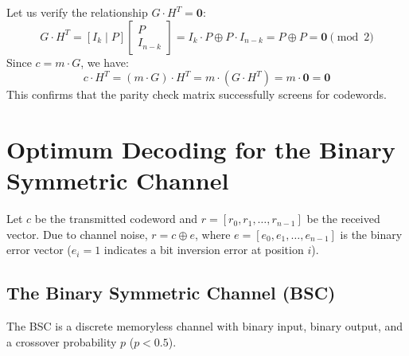 \documentclass[12pt,a4paper]{article}
\begin{document}
\begin{tcolorbox}[examplebox, title={\textbf{Verification of Orthogonality}}]
Let us verify the relationship $G \cdot H^T = \mathbf{0}$:
\[ G \cdot H^T = [I_k \mid P] \begin{bmatrix} P \\ I_{n-k} \end{bmatrix} = I_k \cdot P \oplus P \cdot I_{n-k} = P \oplus P = \mathbf{0} \pmod 2 \]
Since $c = m \cdot G$, we have:
\[ c \cdot H^T = (m \cdot G) \cdot H^T = m \cdot (G \cdot H^T) = m \cdot \mathbf{0} = \mathbf{0} \]
This confirms that the parity check matrix successfully screens for codewords.
\end{tcolorbox}

\section{Optimum Decoding for the Binary Symmetric Channel}

Let $c$ be the transmitted codeword and $r = [r_0, r_1, \dots, r_{n-1}]$ be the received vector. Due to channel noise, $r = c \oplus e$, where $e = [e_0, e_1, \dots, e_{n-1}]$ is the binary error vector ($e_i = 1$ indicates a bit inversion error at position $i$).

\subsection{The Binary Symmetric Channel (BSC)}
The BSC is a discrete memoryless channel with binary input, binary output, and a crossover probability $p$ ($p < 0.5$).

\begin{tcolorbox}[tikzbox, title={Binary Symmetric Channel Model}]
\centering
{}
\end{tcolorbox}
\end{document}
